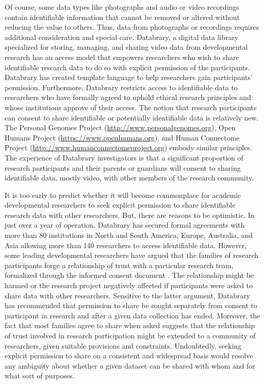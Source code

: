 \documentclass[letterpaper,man,apacite,natbib]{apa6}
\begin{document}
Of course, some data types like photographs and audio or video recordings contain identifiable information that cannot be removed or altered without reducing the value to others.
Thus, data from photographs or recordings requires additional consideration and special care.
Databrary, a digital data library specialized for storing, managing, and sharing video data from developmental research has an access model that empowers researchers who wish to share identifiable research data to do so with explicit permission of the participants.
Databrary has created template language to help researchers gain participants' permission.
Furthermore, Databrary restricts access to identifiable data to researchers who have formally agreed to uphold ethical research principles and whose institutions approve of their access.
The notion that research participants can consent to share identifiable or potentially identifiable data is relatively new.
The Personal Genomes Project (\url{http://www.personalgenomes.org}), Open Humans Project (\url{https://www.openhumans.org}), and Human Connectome Project (\url{http://www.humanconnectomeproject.org}) embody similar principles.
The experience of Databrary investigators is that a significant proportion of research participants and their parents or guardians will consent to sharing identifiable data, mostly video, with other members of the research community.

It is too early to predict whether it will become commonplace for academic developmental researchers to seek explicit permission to share identifiable research data with other researchers.
But, there are reasons to be optimistic.
In just over a year of operation, Databrary has secured formal agreements with more than 80 institutions in North and South America, Europe, Australia, and Asia allowing more than 140 researchers to access identifiable data.
However, some leading developmental researchers have argued that the families of research participants forge a relationship of trust with a particular research team, formalized through the informed consent document \cite{eisenberg_thoughts_2015}.
The relationship might be harmed or the research project negatively affected if participants were asked to share data with other researchers.
Sensitive to the latter argument, Databrary has recommended that permission to share be sought separately from consent to participant in research and after a given data collection has ended.
Moreover, the fact that most families agree to share when asked suggests that the relationship of trust involved in research participation might be extended to a community of researchers, given suitable provisions and constraints.
Undoubtedly, seeking explicit permission to share on a consistent and widespread basis would resolve any ambiguity about whether a given dataset can be shared with whom and for what sort of purposes.
\end{document}
